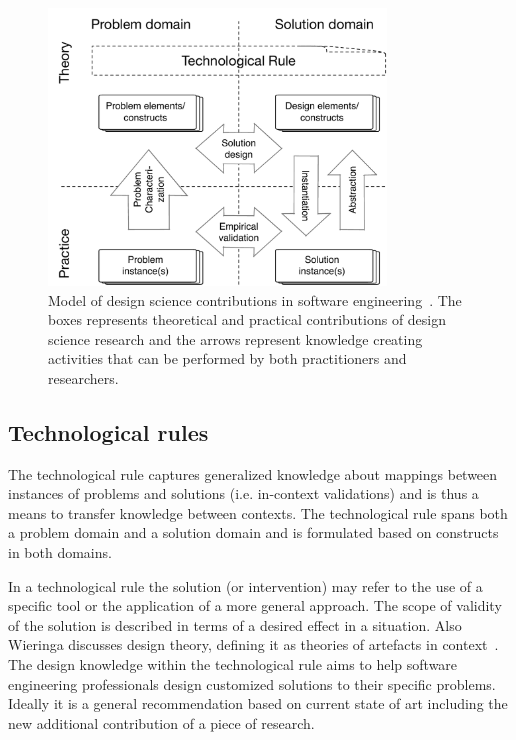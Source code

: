 \documentclass[graybox]{svmult}
\begin{document}
\begin{figure}
  \includegraphics[width=0.8\textwidth]{Figures/DS_model.pdf}
\caption{Model of design science contributions in software engineering~\cite{Engstrom19arxiv}. The boxes represents theoretical and practical contributions of design science research and the arrows represent knowledge creating activities that can be performed by both practitioners and researchers.}
\label{fig:DS_model}       %
\end{figure}



\subsection{Technological rules}
\label{sec:technologicalrules}



The technological rule captures generalized knowledge about mappings between instances of problems and solutions (i.e. in-context validations) and is thus a means to transfer knowledge between contexts. The technological rule spans both a problem domain and a solution domain and is formulated based on constructs in both domains. 

In a technological rule the solution (or intervention) may refer to the use of a specific tool or the application of a more general approach. The scope of validity of the solution is described in terms of a desired effect in a situation.  Also Wieringa discusses design theory, defining it as theories of artefacts in context~\cite{wieringa_design_2009}. The design knowledge within the technological rule aims to help software engineering professionals design customized solutions to their specific problems. Ideally it is a general recommendation based on current state of art including the new additional contribution of a piece of research.
\end{document}
